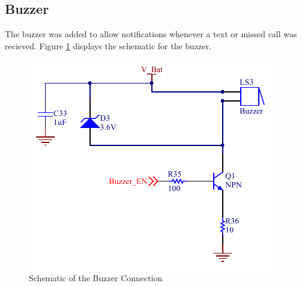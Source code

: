 \subsection{Buzzer}
\label{chap:buzzer}

	The buzzer was added to allow notifications whenever a text or missed call was recieved.
Figure \ref{fig:buzzer} displays the schematic for the buzzer. 

\begin{figure}
	\includegraphics[width=0.5\linewidth]{Figures/buzzer.pdf}\centering
	\caption{Schematic of the Buzzer Connection}
	\label{fig:buzzer}
\end{figure}



